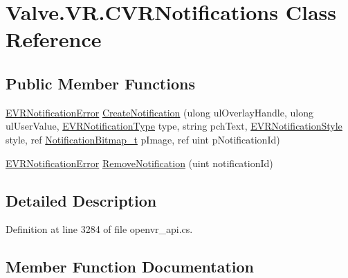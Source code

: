 \hypertarget{class_valve_1_1_v_r_1_1_c_v_r_notifications}{}\section{Valve.\+V\+R.\+C\+V\+R\+Notifications Class Reference}
\label{class_valve_1_1_v_r_1_1_c_v_r_notifications}
\subsection*{Public Member Functions}
\begin{DoxyCompactItemize}
\item 
\mbox{\hyperlink{namespace_valve_1_1_v_r_a9cf788def226e718d9ea88fd55c55646}{E\+V\+R\+Notification\+Error}} \mbox{\hyperlink{class_valve_1_1_v_r_1_1_c_v_r_notifications_aead8ee21d8433b6c4191b423179e1be7}{Create\+Notification}} (ulong ul\+Overlay\+Handle, ulong ul\+User\+Value, \mbox{\hyperlink{namespace_valve_1_1_v_r_a8401e5b24b0e324a8dd57fe55b00fc65}{E\+V\+R\+Notification\+Type}} type, string pch\+Text, \mbox{\hyperlink{namespace_valve_1_1_v_r_a63b67bb250f81d54e3d3839945bb29da}{E\+V\+R\+Notification\+Style}} style, ref \mbox{\hyperlink{struct_valve_1_1_v_r_1_1_notification_bitmap__t}{Notification\+Bitmap\+\_\+t}} p\+Image, ref uint p\+Notification\+Id)
\item 
\mbox{\hyperlink{namespace_valve_1_1_v_r_a9cf788def226e718d9ea88fd55c55646}{E\+V\+R\+Notification\+Error}} \mbox{\hyperlink{class_valve_1_1_v_r_1_1_c_v_r_notifications_a271130f93a5d32164a252dcd4d1edb27}{Remove\+Notification}} (uint notification\+Id)
\end{DoxyCompactItemize}


\subsection{Detailed Description}


Definition at line 3284 of file openvr\+\_\+api.\+cs.



\subsection{Member Function Documentation}
\mbox{\label{class_valve_1_1_v_r_1_1_c_v_r_notifications_aead8ee21d8433b6c4191b423179e1be7}} 
